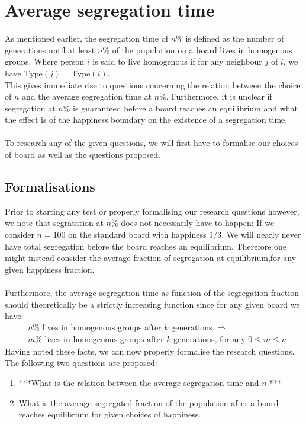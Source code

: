 
\section{Average segregation time}
	As mentioned earlier, the segregation time of \(n\%\) is defined as the number of generations until at least \(n\%\) of the population on a board lives in homogenous groups. 
Where person \(i\) is said to live homogenous if for any neighbour \(j\) of \(i\), we have \(\text{Type}(j)=\text{Type}(i)\).\\
This gives immediate rise to questions concerning the relation between the choice of \(n\) and the average segregation time at \(n\%\). 
Furthermore, it is unclear if segregation at \(n\%\) is guaranteed before a board reaches an equilibrium and what the effect is of the happiness boundary on the existence of a segregation time.\\
\\
To research any of the given questions, we will first have to formalise our choices of board as well as the questions proposed.\\


\subsection{Formalisations}
Prior to starting any test or properly formalising our research questions however, we note that segratation at \(n\%\) does not necessarily have to happen: 
If we consider \(n=100\) on the standard board with happiness \(1/3\). We will nearly never have total segregation before the board reaches an equilibrium.
Therefore one might instead consider the average fraction of segregation at equilibrium,for any given happiness fraction. \\
\\
Furthermore, the average segregation time as function of the segregation fraction should theoretically be a strictly increasing function since for any given board we have:
\begin{align*}
&n\% \text{ lives in homogenous groups after } k \text{ generations } \Rightarrow\\
& m\% \text{ lives in homogenous groups after } k \text{ generations, for any } 0 \leq m \leq n
\end{align*} 
Having noted these facts, we can now properly formalise the research questions.\\
The following two questions are proposed:
\begin{enumerate}
 \item ***What is the relation between the average segregation time and \(n\).***
 \item What is the average segregated fraction of the population after a board reaches equilibrium for given choices of happiness.
\end{enumerate}

